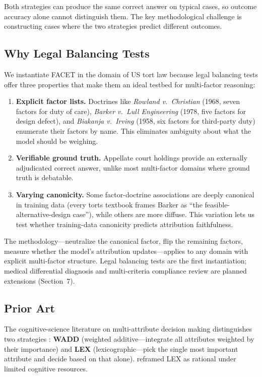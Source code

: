 \documentclass[11pt,twocolumn]{article}
\begin{document}
Both strategies can produce the same correct answer on typical cases, so outcome accuracy alone cannot distinguish them. The key methodological challenge is constructing cases where the two strategies predict different outcomes.

\subsection{Why Legal Balancing Tests}

We instantiate FACET in the domain of US tort law because legal balancing tests offer three properties that make them an ideal testbed for multi-factor reasoning:

\begin{enumerate}
\item \textbf{Explicit factor lists.} Doctrines like \emph{Rowland v.\ Christian} (1968, seven factors for duty of care), \emph{Barker v.\ Lull Engineering} (1978, five factors for design defect), and \emph{Biakanja v.\ Irving} (1958, six factors for third-party duty) enumerate their factors by name. This eliminates ambiguity about what the model should be weighing.
\item \textbf{Verifiable ground truth.} Appellate court holdings provide an externally adjudicated correct answer, unlike most multi-factor domains where ground truth is debatable.
\item \textbf{Varying canonicity.} Some factor-doctrine associations are deeply canonical in training data (every torts textbook frames Barker as ``the feasible-alternative-design case''), while others are more diffuse. This variation lets us test whether training-data canonicity predicts attribution faithfulness.
\end{enumerate}

The methodology---neutralize the canonical factor, flip the remaining factors, measure whether the model's attribution updates---applies to any domain with explicit multi-factor structure. Legal balancing tests are the first instantiation; medical differential diagnosis and multi-criteria compliance review are planned extensions (Section~7).

\subsection{Prior Art}

The cognitive-science literature on multi-attribute decision making distinguishes two strategies \citep{payne1993}: \textbf{WADD} (weighted additive---integrate all attributes weighted by their importance) and \textbf{LEX} (lexicographic---pick the single most important attribute and decide based on that alone). \citet{lieder2020} reframed LEX as rational under limited cognitive resources.
\end{document}

